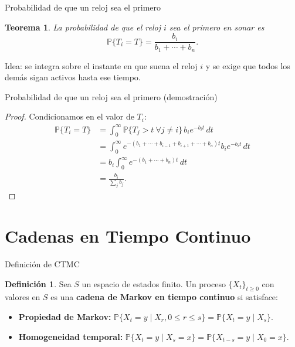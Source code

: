 \documentclass[aspectratio=169]{beamer}
\theoremstyle{plain}
\newtheorem{teorema}{Teorema}
\theoremstyle{definition}
\newtheorem{definicion}{Definición}
\newcommand{\Prob}{\mathbb{P}}
\newcommand{\1}{\mathbf{1}}
\begin{document}
\begin{frame}{Probabilidad de que un reloj sea el primero}
  \begin{teorema}
    La probabilidad de que el reloj $i$ sea el primero en sonar es
    \[ \Prob\{T_i = T\} = \frac{b_i}{b_1 + \cdots + b_n}. \]
  \end{teorema}

  \vspace{0.3cm}
  Idea: se integra sobre el instante en que suena el reloj $i$ y se exige que todos los demás sigan activos hasta ese tiempo.
\end{frame}

\begin{frame}{Probabilidad de que un reloj sea el primero (demostración)}
  \small
  \begin{proof}
    Condicionamos en el valor de $T_i$:
    \begin{align*}
      \Prob\{T_i = T\} &= \int_0^\infty \Prob\{T_j > t\ \forall j\neq i\} \, b_i e^{-b_i t}\,dt \\
      &= \int_0^\infty e^{-(b_1+\cdots+b_{i-1}+b_{i+1}+\cdots+b_n)t} b_i e^{-b_i t}\,dt \\
      &= b_i \int_0^\infty e^{-(b_1+\cdots+b_n)t}\,dt \\
      &= \frac{b_i}{\sum_j b_j}.
    \end{align*}
  \end{proof}
\end{frame}

\section{Cadenas en Tiempo Continuo}

\begin{frame}{Definición de CTMC}
  \begin{definicion}
    Sea $S$ un espacio de estados finito. Un proceso $\{X_t\}_{t\ge0}$ con valores en $S$ es una \textbf{cadena de Markov en tiempo continuo} si satisface:
    \begin{itemize}
      \item \textbf{Propiedad de Markov:} $\Prob\{X_t = y \mid X_r, 0 \leq r \leq s\} = \Prob\{X_t = y \mid X_s\}$.
      \item \textbf{Homogeneidad temporal:} $\Prob\{X_t = y \mid X_s = x\} = \Prob\{X_{t-s} = y \mid X_0 = x\}$.
    \end{itemize}
  \end{definicion}
\end{frame}
\end{document}
